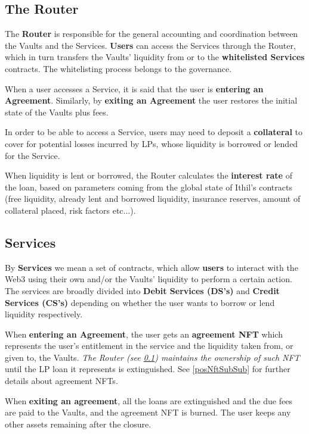 \documentclass[a4paper,10 pt]{article}
\theoremstyle{definition}
\begin{document}
\subsection{The Router}\label{routerSub}

The {\bf Router} is responsible for the general accounting and coordination between the Vaults and the Services. {\bf Users} can access the Services through the Router, which in turn transfers the Vaults' liquidity from or to the {\bf whitelisted Services} contracts. The whitelisting process belongs to the governance.

When a user accesses a Service, it is said that the user is {\bf entering an Agreement}. Similarly, by {\bf exiting an Agreement} the user restores the initial state of the Vaults plus fees.

In order to be able to access a Service, users may need to deposit a {\bf collateral} to cover for potential losses incurred by LPs, whose liquidity is borrowed or lended for the Service.

When liquidity is lent or borrowed, the Router calculates the {\bf interest rate} of the loan, based on parameters coming from the global state of Ithil's contracts (free liquidity, already lent and borrowed liquidity, insurance reserves, amount of collateral placed, risk factors etc...).

\subsection{Services}\label{servicesSub}

By {\bf Services} we mean a set of contracts, which allow {\bf users} to interact with the Web3 using their own and/or the Vaults' liquidity to perform a certain action. The services are broadly divided into {\bf Debit Services (DS's)} and {\bf Credit Services (CS's)} depending on whether the user wants to borrow or lend liquidity respectively.

When {\bf entering an Agreement}, the user gets an {\bf agreement NFT} which represents the user's entitlement in the service and the liquidity taken from, or given to, the Vaults. {\it The Router (see \ref{routerSub}) maintains the ownership of such NFT} until the LP loan it represents is extinguished. See \ref{posNftSubSub} for further details about agreement NFTs.

When {\bf exiting an agreement}, all the loans are extinguished and the due fees are paid to the Vaults, and the agreement NFT is burned. The user keeps any other assets remaining after the closure.
\end{document}
